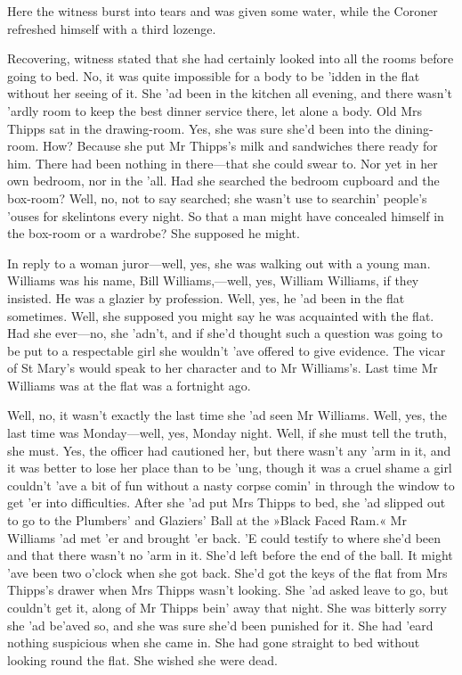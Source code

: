 Here the witness burst into tears and was given some water, while the Coroner refreshed himself with a third lozenge.

Recovering, witness stated that she had certainly looked into all the rooms before going to bed. No, it was quite impossible for a body to be 'idden in the flat without her seeing of it. She 'ad been in the kitchen all evening, and there wasn't 'ardly room to keep the best dinner service there, let alone a body. Old Mrs Thipps sat in the drawing-room. Yes, she was sure she'd been into the dining-room. How? Because she put Mr Thipps's milk and sandwiches there ready for him. There had been nothing in there—that she could swear to. Nor yet in her own bedroom, nor in the 'all. Had she searched the bedroom cupboard and the box-room? Well, no, not to say searched; she wasn't use to searchin' people's 'ouses for skelintons every night. So that a man might have concealed himself in the box-room or a wardrobe? She supposed he might.

In reply to a woman juror—well, yes, she was walking out with a young man. Williams was his name, Bill Williams,---well, yes, William Williams, if they insisted. He was a glazier by profession. Well, yes, he 'ad been in the flat sometimes. Well, she supposed you might say he was acquainted with the flat. Had she ever—no, she 'adn't, and if she'd thought such a question was going to be put to a respectable girl she wouldn't 'ave offered to give evidence. The vicar of St Mary's would speak to her character and to Mr Williams's. Last time Mr Williams was at the flat was a fortnight ago.

Well, no, it wasn't exactly the last time she 'ad seen Mr Williams. Well, yes, the last time was Monday—well, yes, Monday night. Well, if she must tell the truth, she must. Yes, the officer had cautioned her, but there wasn't any 'arm in it, and it was better to lose her place than to be 'ung, though it was a cruel shame a girl couldn't 'ave a bit of fun without a nasty corpse comin' in through the window to get 'er into difficulties. After she 'ad put Mrs Thipps to bed, she 'ad slipped out to go to the Plumbers' and Glaziers' Ball at the »Black Faced Ram.« Mr Williams 'ad met 'er and brought 'er back. 'E could testify to where she'd been and that there wasn't no 'arm in it. She'd left before the end of the ball. It might 'ave been two o'clock when she got back. She'd got the keys of the flat from Mrs Thipps's drawer when Mrs Thipps wasn't looking. She 'ad asked leave to go, but couldn't get it, along of Mr Thipps bein' away that night. She was bitterly sorry she 'ad be'aved so, and she was sure she'd been punished for it. She had 'eard nothing suspicious when she came in. She had gone straight to bed without looking round the flat. She wished she were dead.

